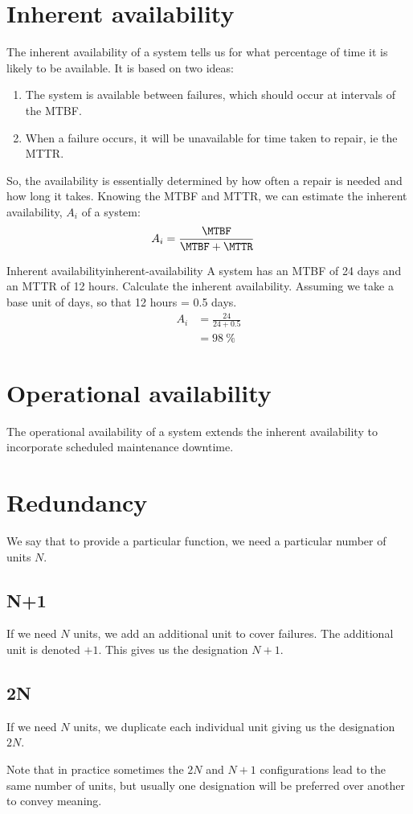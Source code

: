 \documentclass{pgnotes}
\begin{document}
\section{Inherent availability}
The inherent availability of a system tells us for what percentage of time it is likely to be available.
It is based on two ideas:
\begin{enumerate}
\item The system is available between failures, which should occur at intervals of the MTBF.
\item When a failure occurs, it will be unavailable for time taken to repair, ie the MTTR.
\end{enumerate}
So, the availability is essentially determined by how often a repair is needed and how long it takes.
Knowing the MTBF and MTTR, we can estimate the inherent availability, $A_i$ of a system:
\begin{align}
  A_i & = \frac{\MTBF}{\MTBF+\MTTR}
\end{align}
\begin{example}{Inherent availability}{inherent-availability}
  A system has an MTBF of 24 days and an MTTR of 12 hours.
  Calculate the inherent availability.
  \tcblower
  Assuming we take a base unit of days, so that 12 hours = 0.5 days.
  \begin{align}
    A_i & = \frac{24}{24 + 0.5} \\
        & = \SI{98}{\percent}
  \end{align}
\end{example}


\section{Operational availability}

The operational availability of a system extends the inherent availability to incorporate scheduled maintenance downtime. 

\section{Redundancy}

We say that to provide a particular function, we need a particular number of units $N$. 

\subsection{N+1}

If we need $N$ units, we add an additional unit to cover failures.
The additional unit is denoted $+1$.
This gives us the designation $N+1$.

\subsection{2N}

If we need $N$ units, we duplicate each individual unit giving us the designation $2N$.

Note that in practice sometimes the $2N$ and $N+1$ configurations lead to the same number of units, but usually one designation will be preferred over another to convey meaning. 
\end{document}
